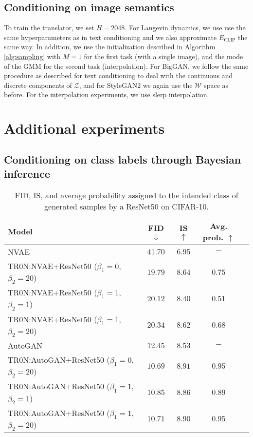 \documentclass[nohyperref]{article}
\theoremstyle{plain}
\theoremstyle{definition}
\theoremstyle{remark}
\begin{document}
\subsection{Conditioning on image semantics}

To train the translator, we set $H=2048$. For Langevin dynamics, we use use the same hyperparameters as in text conditioning and we also approximate $E_{\text{CLIP}}$ the same way. In addition, we use the initialization described in Algorithm \ref{alg:sampling} with $M=1$ for the first task (with a single image), and the mode of the GMM for the second task (interpolation). For BigGAN, we follow the same procedure as described for text conditioning to deal with the continuous and discrete components of $\mathcal{Z}$, and for StyleGAN2 we again use the $\mathcal{W}$ space as before. For the interpolation experiments, we use slerp interpolation.




\section{Additional experiments}\label{app:extra_exps}

\subsection{Conditioning on class labels through Bayesian inference}

\begin{table}[t!]
\vskip -0.15in
\caption{FID, IS, and average probability assigned to the intended class of generated samples by a ResNet50 on CIFAR-10.}
\begin{center}
\begin{tabular}{lcccr}
\toprule
Model & FID $\downarrow$ & IS $\uparrow$ & Avg. prob. $\uparrow$\\
\midrule
NVAE & $41.70$ & $6.95$ & $-$ \\
TR0N:NVAE+ResNet50 ($\beta_1=0$, $\beta_2=20$) & $\mathbf{19.79}$ & $\mathbf{8.64}$ & $\mathbf{0.75}$ \\
TR0N:NVAE+ResNet50 ($\beta_1=1$, $\beta_2=1$) & $20.12$ & $8.40$ & $0.51$ \\
TR0N:NVAE+ResNet50 ($\beta_1=1$, $\beta_2=20$) & $20.34$ & $8.62$ & $0.68$ \\

\midrule
AutoGAN & $12.45$ & $8.53$ & $-$ \\
TR0N:AutoGAN+ResNet50 ($\beta_1=0$, $\beta_2=20$) & $\mathbf{10.69}$ & $\mathbf{8.91}$ & $\mathbf{0.95}$\\
TR0N:AutoGAN+ResNet50 ($\beta_1=1$, $\beta_2=1$) & $10.85$ & $8.86$ & $0.89$ \\
TR0N:AutoGAN+ResNet50 ($\beta_1=1$, $\beta_2=20$) & $10.71$ & $ 8.90 $ & $\mathbf{0.95}$ \\
\bottomrule
\end{tabular}
\end{center}
\label{table:cifar-bayes}
\vskip -0.20in
\end{table}
\end{document}
